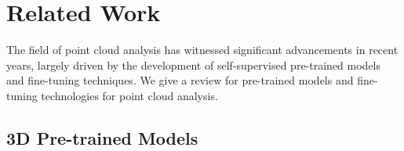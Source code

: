 \section{Related Work}
\label{sec:relatedwork}
The field of point cloud analysis has witnessed significant advancements in recent years, largely driven by the development of self-supervised pre-trained models and fine-tuning techniques. We give a review for pre-trained models and fine-tuning technologies for point cloud analysis.

\subsection{3D Pre-trained Models}


